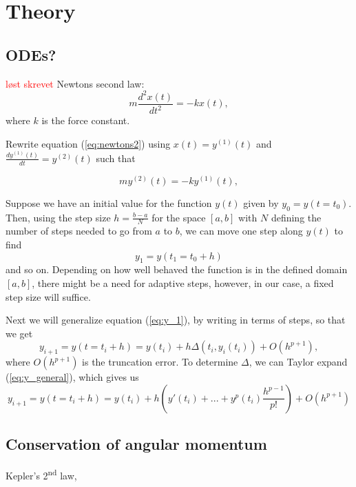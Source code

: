 \documentclass[../main.tex]{subfiles}
\begin{document}
\section{Theory}\label{sec:theory}

\subsection{ODEs?}
\textcolor{red}{løst skrevet}
Newtons second law:
\begin{equation}\label{eq:newtons2}
    m\frac{d^2 x(t)}{dt^2} = -kx(t),
\end{equation} where $k$ is the force constant.

Rewrite equation (\ref{eq:newtons2}) using $x(t) = y^{(1)}(t)$ and $\frac{d y^{(1)}(t)}{dt} =  y^{(2)}(t)$ such that %

\begin{equation}
    my^{(2)}(t) = -ky^{(1)}(t),
\end{equation}

Suppose we have an initial value for the function $y(t)$ given by $y_0 = y(t=t_0)$. Then, using the step size $h = \frac{b - a}{N}$ for the space $[a,b]$ with $N$ defining the number of steps needed to go from $a$ to $b$, we can move one step along $y(t)$ to find 
\begin{equation}\label{eq:y_1}
    y_1 = y(t_1 = t_0 + h)
\end{equation}
and so on. Depending on how well behaved the function is in the defined domain $[a, b]$, there might be a need for adaptive steps, however, in our case, a fixed step size will suffice. 

Next we will generalize equation (\ref{eq:y_1}), by writing in terms of steps, so that we get
\begin{equation}\label{eq:y_general}
    y_{i + 1} = y(t= t_i + h) = y(t_i) + h \Delta (t_i , y_i (t_i)) + O(h^{p + 1}), 
\end{equation}
where $O(h^{p + 1})$ is the truncation error. To determine $\Delta$, we can Taylor expand (\ref{eq:y_general}), which gives us 
\begin{equation}
    y_{i + 1} = y(t= t_i + h) = y(t_i) + h \left( y'(t_i) + ... + y^{p}(t_i) \frac{h^{p - 1}}{p!} \right) + O(h^{p + 1})
\end{equation}

\subsection{Conservation of angular momentum}
Kepler's 2\textsuperscript{nd} law, 
\end{document}
